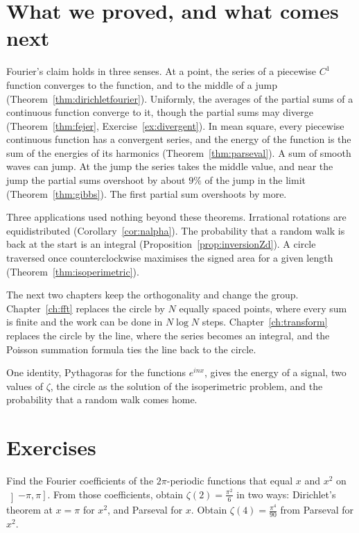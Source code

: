 \section{What we proved, and what comes next}

Fourier's claim holds in three senses. At a point, the series of a piecewise $C^1$ function converges to the function, and to the middle of a jump (Theorem~\ref{thm:dirichletfourier}). Uniformly, the averages of the partial sums of a continuous function converge to it, though the partial sums may diverge (Theorem~\ref{thm:fejer}, Exercise~\ref{ex:divergent}). In mean square, every piecewise continuous function has a convergent series, and the energy of the function is the sum of the energies of its harmonics (Theorem~\ref{thm:parseval}). A sum of smooth waves can jump. At the jump the series takes the middle value, and near the jump the partial sums overshoot by about $9\%$ of the jump in the limit (Theorem~\ref{thm:gibbs}). The first partial sum overshoots by more.

Three applications used nothing beyond these theorems. Irrational rotations are equidistributed (Corollary~\ref{cor:nalpha}). The probability that a random walk is back at the start is an integral (Proposition~\ref{prop:inversionZd}). A circle traversed once counterclockwise maximises the signed area for a given length (Theorem~\ref{thm:isoperimetric}).

The next two chapters keep the orthogonality and change the group. Chapter~\ref{ch:fft} replaces the circle by $N$ equally spaced points, where every sum is finite and the work can be done in $N\log N$ steps. Chapter~\ref{ch:transform} replaces the circle by the line, where the series becomes an integral, and the Poisson summation formula ties the line back to the circle.

\begin{beauty}
One identity, Pythagoras for the functions $e^{inx}$, gives the energy of a signal, two values of $\zeta$, the circle as the solution of the isoperimetric problem, and the probability that a random walk comes home.
\end{beauty}

\section{Exercises}

\begin{exercise}[$\star$]\label{ex:x2}
Find the Fourier coefficients of the $2\pi$-periodic functions that equal $x$ and $x^2$ on $\left]-\pi,\pi\right]$. From those coefficients, obtain $\zeta(2)=\frac{\pi^2}6$ in two ways: Dirichlet's theorem at $x=\pi$ for $x^2$, and Parseval for $x$. Obtain $\zeta(4)=\frac{\pi^4}{90}$ from Parseval for $x^2$.
\end{exercise}

